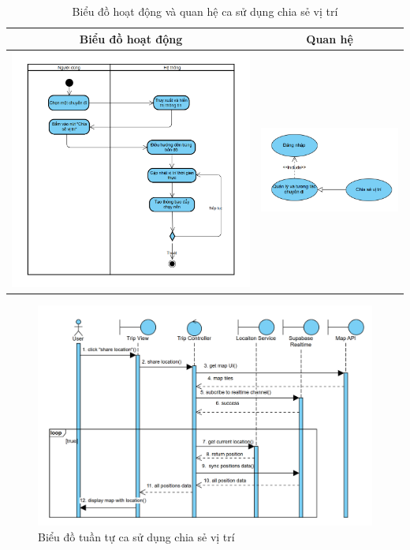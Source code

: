 \vspace{0.8cm}

\begin{table}[H] %
    \centering
    \caption{Biểu đồ hoạt động và quan hệ ca sử dụng chia sẻ vị trí} %
    \label{tab:uc_share_location_diagrams} %
    \begin{tabular}{| c | c |}
        \hline
        \textbf{Biểu đồ hoạt động} & \textbf{Quan hệ} \\
        \hline
        \includegraphics[width=0.5\linewidth]{figures/c3/3-3-16-ad.png} %
        &
        \includegraphics[width=0.45\linewidth]{figures/c3/3-3-16-rd.png} \\ %
        \hline
    \end{tabular}
\end{table}

\begin{figure}[H]
    \centering
    \includegraphics[width=1\textwidth]{figures/c3/3-3-16-sd.png} %
    \caption{Biểu đồ tuần tự ca sử dụng chia sẻ vị trí} %
    \label{fig:3-3-16-sequence-diagram}
\end{figure}